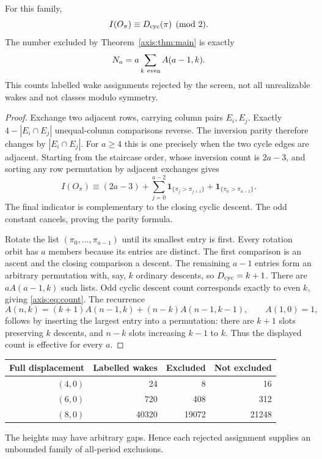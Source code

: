 \begin{theorem}\label{axis:thm:count}
For this family,
\[
 I(O_\pi)\equiv D_{\rm cyc}(\pi)\pmod2.
\]
The number excluded by Theorem~\ref{axis:thm:main} is exactly
\begin{equation}\label{axis:eq:count}
 N_a=a\sum_{k\ {\rm even}} A(a-1,k).
\end{equation}
This counts labelled wake assignments rejected by the screen, not all
unrealizable wakes and not classes modulo symmetry.
\end{theorem}
\begin{proof}
Exchange two adjacent rows, carrying column pairs $E_i,E_j$.
Exactly $4-|E_i\cap E_j|$ unequal-column comparisons reverse. The inversion
parity therefore changes by $|E_i\cap E_j|$. For $a\ge4$ this is one precisely
when the two cycle edges are adjacent. Starting from the staircase order,
whose inversion count is $2a-3$, and sorting any row permutation by adjacent
exchanges gives
\[
 I(O_\pi)\equiv (2a-3)+
 \sum_{j=0}^{a-2}\mathbf1_{\{\pi_j>\pi_{j+1}\}}
 +\mathbf1_{\{\pi_0>\pi_{a-1}\}}.
\]
The final indicator is complementary to the closing cyclic descent. The odd
constant cancels, proving the parity formula.

Rotate the list $(\pi_0,\ldots,\pi_{a-1})$ until its smallest entry is first.
Every rotation orbit has $a$ members because its entries are distinct.
The first comparison is an ascent and the closing comparison a descent.
The remaining $a-1$ entries form an arbitrary permutation with, say, $k$
ordinary descents, so $D_{\rm cyc}=k+1$. There are $aA(a-1,k)$ such lists.
Odd cyclic descent count corresponds exactly to even $k$, giving \eqref{axis:eq:count}.
The recurrence
\[
 A(n,k)=(k+1)A(n-1,k)+(n-k)A(n-1,k-1),\qquad A(1,0)=1,
\]
follows by inserting the largest entry into a permutation: there are $k+1$
slots preserving $k$ descents, and $n-k$ slots increasing $k-1$ to $k$.
Thus the displayed count is effective for every $a$.
\end{proof}

\begin{center}
\begin{tabular}{rrrr}\toprule
Full displacement & Labelled wakes & Excluded & Not excluded\\\midrule
$(4,0)$ & 24 & 8 & 16\\
$(6,0)$ & 720 & 408 & 312\\
$(8,0)$ & 40320 & 19072 & 21248\\\bottomrule
\end{tabular}
\end{center}
The heights may have arbitrary gaps. Hence each rejected assignment supplies
an unbounded family of all-period exclusions.

